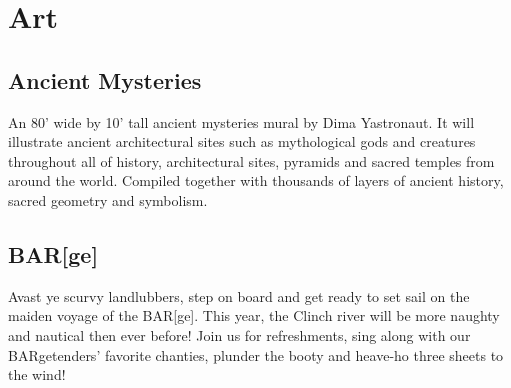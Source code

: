 %
%

\chapter{Art}

\ifisflight
\putchapterthumb
\fi




\section*{Ancient Mysteries}
An 80' wide by 10' tall ancient mysteries mural by Dima Yastronaut. It will illustrate ancient architectural sites such as mythological gods and creatures throughout all of history, architectural sites, pyramids and sacred temples from around the world. Compiled together with thousands of layers of ancient history, sacred geometry and symbolism.

\section*{BAR[ge]}
Avast ye scurvy landlubbers, step on board and get ready to set sail on the maiden voyage of the BAR[ge]. This year, the Clinch river will be more naughty and nautical then ever before! Join us for refreshments, sing along with our BARgetenders' favorite chanties, plunder the booty and heave-ho three sheets to the wind!



